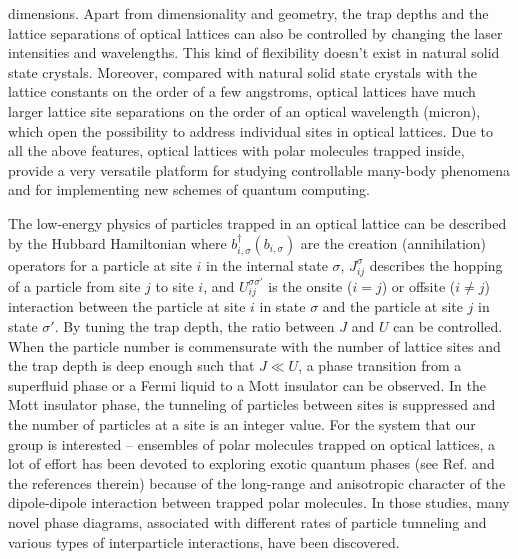 dimensions. Apart from dimensionality and geometry, the trap depths and the lattice separations of optical lattices can also be controlled
by changing the laser intensities and wavelengths. This kind of flexibility doesn't exist in natural solid state crystals. 
Moreover, compared with natural solid state crystals with the lattice constants on the order of a few angstroms, optical lattices have much larger lattice site separations on the order of an optical wavelength (micron), which open the possibility to address individual sites in optical lattices\cite{atom-mott1, atom-mott2}. 
Due to all the above features, optical lattices with polar molecules trapped inside, provide a very versatile platform for studying controllable many-body 
  phenomena\cite{Baranov2012} and for implementing new schemes of quantum computing\cite{demille, yelin2006, ortner2011}. 
  
The low-energy physics of particles trapped in an optical lattice can be described by the Hubbard Hamiltonian
where $b^{\dagger}_{i, \sigma} (b_{i, \sigma})$ are the creation (annihilation) operators for a particle at site $i$ in the
internal state $\sigma$, $J_{ij}^{\sigma}$ describes the hopping of a particle from site $j$ to site $i$, and $U_{i j}^{\sigma \sigma'}$ is the onsite ($i=j$) or offsite ($i\neq j$) interaction between the particle at site $i$ in state $\sigma$ and the particle at site $j$ in state $\sigma'$. By tuning the trap depth, the ratio between $J$ and $U$ can
be controlled. When  the particle number is commensurate with the 
number of lattice sites and the trap depth is deep enough such that $J \ll U$, a phase transition from a superfluid phase
or a  Fermi liquid to a Mott insulator can be 
observed\cite{Greiner2002, spielman2007, haller2010, joerdens2008, Schneider2008}. In the Mott insulator phase, the tunneling of particles between sites
is suppressed and the number of particles at a site is an integer value. For the system that our group is interested -- ensembles of 
polar molecules trapped on optical lattices, a lot of effort has been devoted to exploring exotic quantum phases (see Ref.\cite{Baranov2012} and the references therein) because of the long-range and anisotropic character of the 
dipole-dipole interaction between trapped polar molecules.  
In those studies, many novel phase diagrams, associated with different rates of particle tunneling and various types of 
interparticle interactions, have been discovered.

